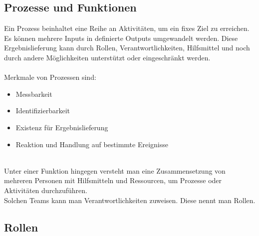 {\subsection{Prozesse und Funktionen}
\label{chap: Prozesse und Funktionen}

Ein Prozess beinhaltet eine Reihe an Aktivitäten, um ein fixes Ziel zu erreichen. Es können mehrere Inputs in definierte Outputs umgewandelt werden. Diese Ergebnislieferung kann durch Rollen, Verantwortlichkeiten, 
Hilfsmittel und noch durch andere Möglichkeiten unterstützt oder eingeschränkt werden.
\\ \\
Merkmale von Prozessen sind:
\begin{itemize}
    \item Messbarkeit
    \item Identifizierbarkeit
    \item Existenz für Ergebnislieferung
    \item Reaktion und Handlung auf bestimmte Ereignisse
\end{itemize}

\leavevmode
\\
Unter einer Funktion hingegen versteht man eine Zusammensetzung von mehreren Personen mit Hilfsmitteln und Ressourcen, um Prozesse oder Aktivitäten durchzuführen.
\\
Solchen Teams kann man Verantwortlichkeiten zuweisen. Diese nennt man Rollen.

\subsection{Rollen}
\label{chap: Rollen}

}
